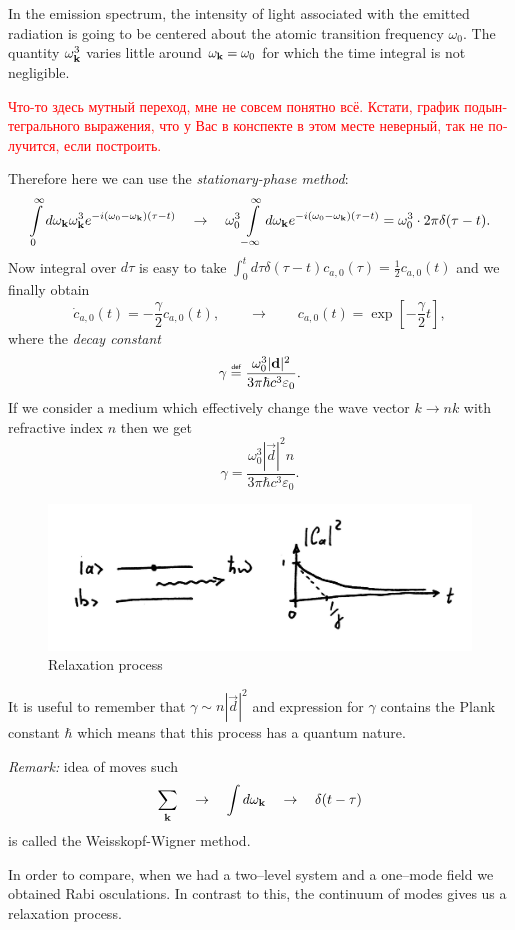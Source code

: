 In the emission spectrum, the intensity of light associated with the emitted radiation is going to be centered about the atomic transition frequency $\omega_0$. The quantity $\omega_{\mathbf{k}}^3$ varies little around $\omega_{\mathbf{k}} = \omega_0$ for which the time integral is not negligible. 
\begin{otherlanguage}{russian}	
\textcolor{red}{Что-то здесь мутный переход, мне не совсем понятно всё. Кстати, график подынтегрального выражения, что у Вас в конспекте в этом месте неверный, так не получится, если построить.}
\end{otherlanguage}
Therefore here we can use the \textit{stationary-phase method}:
\begin{equation}
	\int \limits_{0}^{\infty} d \omega_{\mathbf{k}}  \omega_{\mathbf{k}}^3 e^{-i (\omega_0 - \omega_{\mathbf{k}})(\tau - t)} \quad \to \quad \omega_{0}^3 \int \limits_{-\infty}^{\infty} d \omega_{\mathbf{k}} e^{-i (\omega_0 - \omega_{\mathbf{k}})(\tau - t)} = \omega_{0}^3 \cdot 2 \pi \delta(\tau - t).
\end{equation}
Now integral over $d \tau$ is easy to take $\int_0^t d \tau \delta(\tau - t) c_{a,0}(\tau) = \frac{1}{2} c_{a,0}(t)$ and we finally obtain
\begin{equation}
	\dot{c}_{a,0} (t) = - \frac{\gamma}{2} c_{a,0} (t), \qquad \to \qquad c_{a,0}(t) = \exp \left[- \frac{\gamma}{2} t \right],
\end{equation}
where the \textit{decay constant}
\begin{equation}
	\gamma \myeq \frac{\omega_{0}^3 |\vec{d}|^2}{3 \pi \hbar c^3 \varepsilon_0}.
\end{equation}
If we consider a medium which effectively change the wave vector  $k \to nk$ with refractive index $n$ then we get
\begin{equation}
	\gamma = \frac{\omega_{0}^3 |\vec{d}|^2 n}{3 \pi \hbar c^3 \varepsilon_0}.
\end{equation}
\begin{figure}
	\centering
	\includegraphics[width=0.65\linewidth]{fig/L7/emissions}
	\caption{Relaxation process}
	\label{fig:emission}
\end{figure}

It is useful to remember that $\gamma \sim n |\vec{d}|^2$ and expression for $\gamma$ contains the Plank constant $\hbar$ which means that this process has a quantum nature.

\textit{Remark:} idea of moves such
\begin{equation}
	\sum_{\mathbf{k}} \quad \to \quad \int d \omega_{\mathbf{k}} \quad \to \quad \delta(t - \tau)
\end{equation}
is called the Weisskopf-Wigner method.

In order to compare, when we had a two--level system and a one--mode field we obtained Rabi osculations. In contrast to this, the continuum of modes gives us a relaxation process. 